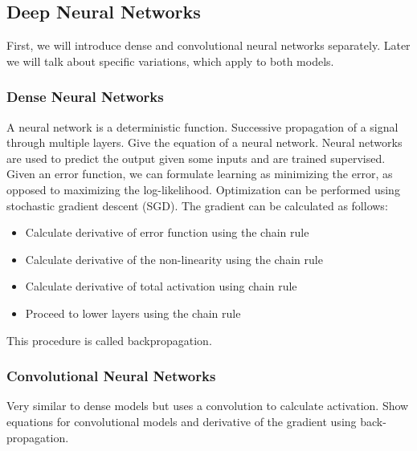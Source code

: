 \documentclass{report}
\begin{document}
% 

\subsection{Deep Neural Networks}

First, we will introduce dense and convolutional neural networks separately.
Later we will talk about specific variations, which apply to both models.

\subsubsection{Dense Neural Networks}

A neural network is a deterministic function. Successive propagation of a signal
through multiple layers. Give the equation of a neural network. Neural networks
are used to predict the output given some inputs and are trained supervised.
Given an error function, we can formulate learning as minimizing the error, as
opposed to maximizing the log-likelihood. Optimization can be performed using
stochastic gradient descent (SGD). The gradient can be calculated as follows:
\begin{itemize}
\item Calculate derivative of error function using the chain rule
\item Calculate derivative of the non-linearity using the chain rule
\item Calculate derivative of total activation using chain rule
\item Proceed to lower layers using the chain rule
\end{itemize}
This procedure is called backpropagation.

\subsubsection{Convolutional Neural Networks}

Very similar to dense models but uses a convolution to calculate activation.
Show equations for convolutional models and derivative of the gradient using
back-propagation.
\end{document}
